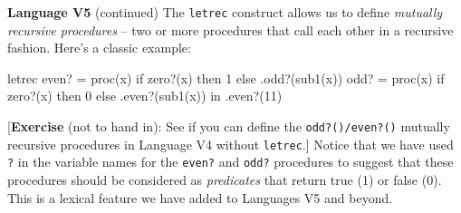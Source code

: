 \begin{minipage}[t]{\sw}
\slidenumber
\LARGE
{\bf Language V5} (continued)\exx
The \verb'letrec' construct allows us
to define {\em mutually recursive procedures} --
two or more procedures that call each other in a recursive fashion.
Here's a classic example:
{\Large
\begin{qv}
letrec
  even? = proc(x) if zero?(x) then 1 else .odd?(sub1(x))
  odd? = proc(x) if zero?(x) then 0 else .even?(sub1(x))
in
  .even?(11) %
\end{qv}
}
[{\bf Exercise} (not to hand in):
See if you can define the \verb'odd?()/even?()'
mutually recursive procedures
in Language V4 without \verb'letrec'.]\exx
Notice that we have used \verb'?'
in the variable names for the \verb'even?' and \verb'odd?' procedures
to suggest that these procedures should be considered
as {\em predicates} that return true (1) or false (0).
This is a lexical feature we have added
to Languages V5 and beyond.
\end{minipage}
\clearpage
